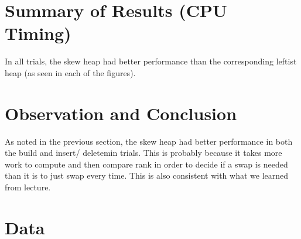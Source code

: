 \documentclass{article}
\begin{document}
\section{Summary of Results (CPU Timing)}
In all trials, the skew heap had better performance than the corresponding leftist heap (as seen in 
each of the figures).






\section{Observation and Conclusion}
As noted in the previous section, the skew heap had better performance in both the build and insert/
deletemin trials. This is probably because it takes more work to compute and then compare rank in 
order to decide if a swap is needed than it is to just swap every time.  This is also consistent 
with what we learned from lecture.






\section{Data}
\end{document}
